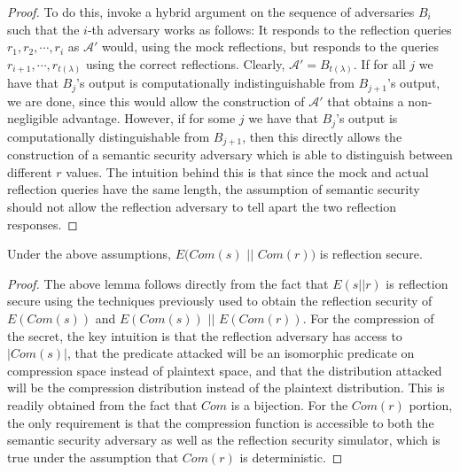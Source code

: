 \begin{proof}
    To do this, invoke a hybrid argument on the sequence of adversaries $B_i$
    such that the $i$-th adversary works as follows: It responds to the
    reflection queries $r_1, r_2, \cdots, r_i$ as $\mathcal{A'}$ would,
    using the mock reflections, but responds to the queries $r_{i+1},
    \cdots, r_{t(\lambda)}$ using the correct reflections. Clearly,
    $\mathcal{A'} = B_{t(\lambda)}$. If for all $j$ we have that $B_j$'s output
    is computationally indistinguishable from $B_{j+1}$'s output, we are done,
    since this would allow the construction of $\mathcal{A'}$ that obtains a
    non-negligible advantage. However, if for some $j$ we have that $B_j$'s
    output is computationally distinguishable from $B_{j+1}$, then this
    directly allows the construction of a semantic security adversary which is
    able to distinguish between different $r$ values. The intuition behind this
    is that since the mock and actual reflection queries have the same length,
    the assumption of semantic security should not allow the reflection
    adversary to tell apart the two reflection responses.
\end{proof}

\begin{lemma}
    Under the above assumptions, $E(Com(s)$ $||$ $Com(r))$ is reflection secure.
\end{lemma}

\begin{proof}
    The above lemma follows directly from the fact that $E(s || r)$ is
    reflection secure using the techniques previously used to obtain the
    reflection security of $E(Com(s))$ and $E(Com(s))$ $||$ $E(Com(r))$. For the
    compression of the secret, the key intuition is that the reflection
    adversary has access to $|Com(s)|$, that the predicate attacked will be an
    isomorphic predicate on compression space instead of plaintext space, and
    that the distribution attacked will be the compression distribution instead
    of the plaintext distribution. This is readily obtained from the fact that
    $Com$ is a bijection. For the $Com(r)$ portion, the only
    requirement is that the compression function is accessible to both the
    semantic security adversary as well as the reflection security simulator,
    which is true under the assumption that $Com(r)$ is deterministic.
\end{proof}
